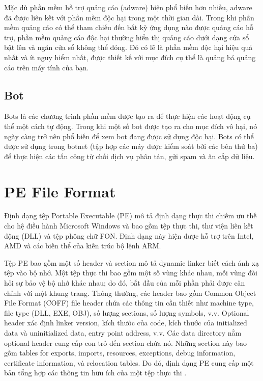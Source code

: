 Mặc dù phần mềm hỗ trợ quảng cáo (adware) hiện phổ biến hơn nhiều, adware đã được liên kết với phần mềm độc hại trong một thời gian dài. Trong khi phần mềm quảng cáo có thể tham chiếu đến bất kỳ ứng dụng nào được quảng cáo hỗ trợ, phần mềm quảng cáo độc hại thường hiển thị quảng cáo dưới dạng cửa sổ bật lên và ngăn cửa sổ không thể đóng. Đó có lẽ là phần mềm độc hại hiệu quả nhất và ít nguy hiểm nhất, được thiết kế với mục đích cụ thể là quảng bá quảng cáo trên máy tính của bạn.

\subsection{Bot}

Bots là các chương trình phần mềm được tạo ra để thực hiện các hoạt động cụ thể một cách tự động. Trong khi một số bot được tạo ra cho mục đích vô hại, nó ngày càng trở nên phổ biến để xem bot đang được sử dụng độc hại. Bots có thể được sử dụng trong botnet (tập hợp các máy được kiểm soát bởi các bên thứ ba) để thực hiện các tấn công từ chối dịch vụ phân tán, gửi spam và ăn cắp dữ liệu.

\section{PE File Format}
\label{sec:pe-file}

Định dạng tệp Portable Executable (PE) mô tả định dạng thực thi chiếm ưu thế cho hệ điều hành Microsoft Windows và bao gồm tệp thực thi, thư viện liên kết động (DLL) và tệp phông chữ FON. Định dạng này hiện được hỗ trợ trên Intel, AMD và các biến thể của kiến trúc bộ lệnh ARM.

Tệp PE bao gồm một số header và section mô tả dynamic linker biết cách ánh xạ tệp vào bộ nhớ. Một tệp thực thi bao gồm một số vùng khác nhau, mỗi vùng đòi hỏi sự bảo vệ bộ nhớ khác nhau; do đó, bắt đầu của mỗi phần phải được căn chỉnh với một khung trang. Thông thường, các header bao gồm Common Object File Format (COFF) file header chứa các thông tin cần thiết như machine type, file type (DLL, EXE, OBJ), số lượng sections, số lượng symbols, v.v. Optional header xác định linker version, kích thước của code, kích thước của initialized data và uninitialized data, entry point address, v.v. Các data directory nằm optional header cung cấp con trỏ đến section chứa nó. Những section này bao gồm tables for exports, imports, resources, exceptions, debug information, certificate information, và relocation tables. Do đó, định dạng PE cung cấp một bản tổng hợp các thông tin hữu ích của một tệp thực thi \cite{shafiq2009pe}. 

